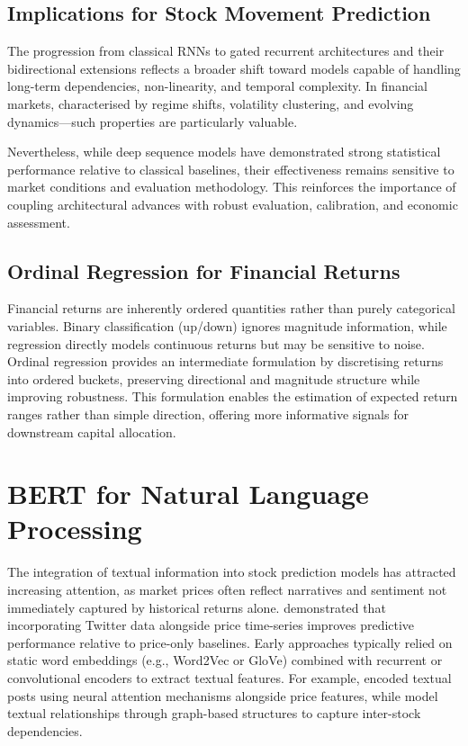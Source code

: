 \documentclass{l4proj}
\begin{document}
\subsection{Implications for Stock Movement Prediction}

The progression from classical RNNs to gated recurrent architectures and their bidirectional extensions reflects a broader shift toward models capable of handling long-term dependencies, non-linearity, and temporal complexity. In financial markets, characterised by regime shifts, volatility clustering, and evolving dynamics—such properties are particularly valuable.

Nevertheless, while deep sequence models have demonstrated strong statistical performance relative to classical baselines, their effectiveness remains sensitive to market conditions and evaluation methodology. This reinforces the importance of coupling architectural advances with robust evaluation, calibration, and economic assessment.

\subsection{Ordinal Regression for Financial Returns}

Financial returns are inherently ordered quantities rather than purely categorical variables. Binary classification (up/down) ignores magnitude information, while regression directly models continuous returns but may be sensitive to noise. Ordinal regression provides an intermediate formulation by discretising returns into ordered buckets, preserving directional and magnitude structure while improving robustness. This formulation enables the estimation of expected return ranges rather than simple direction, offering more informative signals for downstream capital allocation. 

\section{BERT for Natural Language Processing}

The integration of textual information into stock prediction models has attracted increasing attention, as market prices often reflect narratives and sentiment not immediately captured by historical returns alone. \citet{xu-cohen-2018-stock} demonstrated that incorporating Twitter data alongside price time-series improves predictive performance relative to price-only baselines. Early approaches typically relied on static word embeddings (e.g., Word2Vec or GloVe) combined with recurrent or convolutional encoders to extract textual features. For example, \citet{he2022multimodalattentionnetworkstock} encoded textual posts using neural attention mechanisms alongside price features, while \citet{ijcai2020p626} model textual relationships through graph-based structures to capture inter-stock dependencies.
\end{document}
